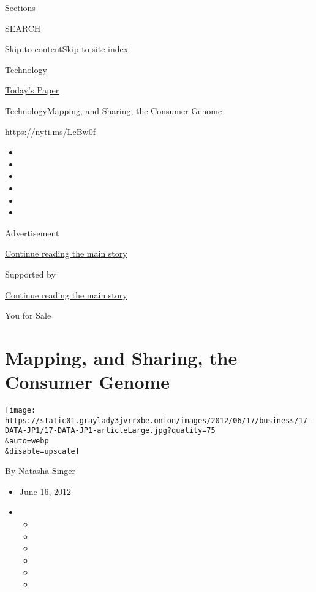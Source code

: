 Sections

SEARCH

\protect\hyperlink{site-content}{Skip to
content}\protect\hyperlink{site-index}{Skip to site index}

\href{https://www.nytimes3xbfgragh.onion/section/technology}{Technology}

\href{https://myaccount.nytimes3xbfgragh.onion/auth/login?response_type=cookie\&client_id=vi}{}

\href{https://www.nytimes3xbfgragh.onion/section/todayspaper}{Today's
Paper}

\href{/section/technology}{Technology}\textbar{}Mapping, and Sharing,
the Consumer Genome

\url{https://nyti.ms/LcBw0f}

\begin{itemize}
\item
\item
\item
\item
\item
\item
\end{itemize}

Advertisement

\protect\hyperlink{after-top}{Continue reading the main story}

Supported by

\protect\hyperlink{after-sponsor}{Continue reading the main story}

You for Sale

\hypertarget{mapping-and-sharing-the-consumer-genome}{%
\section{Mapping, and Sharing, the Consumer
Genome}\label{mapping-and-sharing-the-consumer-genome}}

\texttt{[image: https://static01.graylady3jvrrxbe.onion/images/2012/06/17/business/17-DATA-JP1/17-DATA-JP1-articleLarge.jpg?quality=75\\\&auto=webp\\\&disable=upscale]}

By \href{https://www.nytimes3xbfgragh.onion/by/natasha-singer}{Natasha
Singer}

\begin{itemize}
\item
  June 16, 2012
\item
  \begin{itemize}
  \item
  \item
  \item
  \item
  \item
  \item
  \end{itemize}
\end{itemize}


